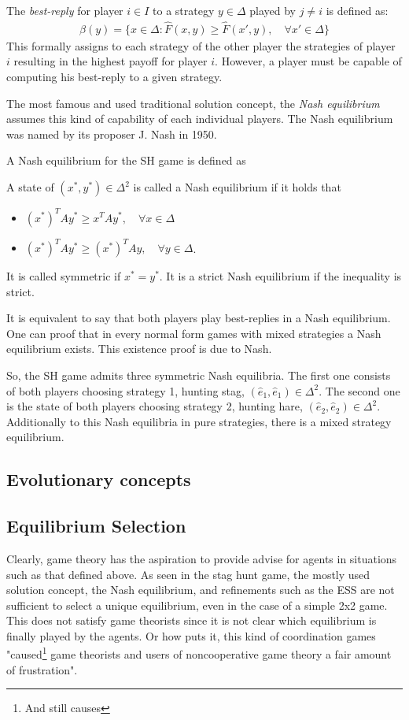 \documentclass[12pt]{article}
\begin{document}
The \textit{best-reply} for player $i \in I$ to a strategy $y \in \Delta$ 
played by $j \neq i$ is defined as:
\begin{align}
        \beta(y) = \{x \in \Delta: \hat{F}(x,y) \geq \hat{F}(x',y), 
        \quad \forall x' \in \Delta\}
\end{align}
This formally assigns to each strategy of the other player the strategies
of player $i$ resulting in the highest payoff for player $i$. However, a player
must be capable of computing his best-reply to a given strategy.

The most famous and used traditional solution concept, the \textit{Nash 
equilibrium} assumes this kind of capability of each individual players. 
The Nash equilibrium was named by its proposer J. Nash in 1950. 

A Nash equilibrium for the SH game is defined as
\begin{mydef}
        A state of $(x^*,y^*) \in \Delta^2$ is called a Nash equilibrium if 
        it holds that
\begin{itemize}
        \item   $(x^*)^T A y^* \geq x^T A y^*, \quad \forall x \in \Delta$
        \item   $(x^*)^T A y^* \geq (x^*)^T A y, \quad \forall y \in \Delta$.
\end{itemize}
It is called symmetric if $x^* = y^*$. It is a strict Nash equilibrium if 
the inequality is strict.
\end{mydef}
It is equivalent to say that both players play best-replies in a Nash 
equilibrium. One can proof that in every normal form games with mixed 
strategies a Nash equilibrium exists. This existence proof is due to Nash.

So, the SH game admits three symmetric Nash equilibria. The first one consists
of both players choosing strategy 1, hunting stag, $(\hat{e}_1,\hat{e}_1) \in
\Delta^2$. The second one is the state of 
both players choosing strategy 2, hunting hare, $(\hat{e}_2,\hat{e}_2)
\in \Delta^2$. Additionally to this Nash equilibria in pure strategies, there 
is a mixed strategy equilibrium. 
\subsection{Evolutionary concepts}

\subsection{Equilibrium Selection}
Clearly, game theory has the aspiration to provide advise for agents in 
situations such as that defined above.
As seen in the stag hunt game, the mostly used solution concept, 
the Nash equilibrium, and refinements such as the ESS are
not sufficient to select a unique equilibrium, even in the case of a simple
2x2 game. This does not satisfy game theorists since it is not clear which
equilibrium is finally played by the agents. Or how \cite{weibull} puts it,
this kind of coordination games "caused\footnote{And still causes} game theorists and users of 
noncooperative game theory a fair amount of frustration". 
\end{document}
